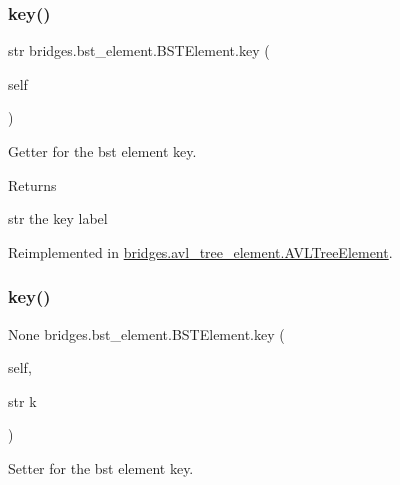 \mbox{\label{classbridges_1_1bst__element_1_1_b_s_t_element_ae911a11782ad4623b21781c5eeeb7d39}} 
\subsubsection{\texorpdfstring{key()}{key()}\hspace{0.1cm}{\footnotesize\ttfamily [1/2]}}
{\footnotesize\ttfamily  str bridges.\+bst\+\_\+element.\+B\+S\+T\+Element.\+key (\begin{DoxyParamCaption}\item[{}]{self }\end{DoxyParamCaption})}



Getter for the bst element key. 

\begin{DoxyReturn}{Returns}


str the key label 
\end{DoxyReturn}


Reimplemented in \mbox{\hyperlink{classbridges_1_1avl__tree__element_1_1_a_v_l_tree_element_ac830bbf88d156574fd23a8b1eaa6bc69}{bridges.\+avl\+\_\+tree\+\_\+element.\+A\+V\+L\+Tree\+Element}}.

\mbox{\label{classbridges_1_1bst__element_1_1_b_s_t_element_a646b48db2f62727bc86b51ed09069155}} 
\subsubsection{\texorpdfstring{key()}{key()}\hspace{0.1cm}{\footnotesize\ttfamily [2/2]}}
{\footnotesize\ttfamily  None bridges.\+bst\+\_\+element.\+B\+S\+T\+Element.\+key (\begin{DoxyParamCaption}\item[{}]{self,  }\item[{str}]{k }\end{DoxyParamCaption})}



Setter for the bst element key. 


